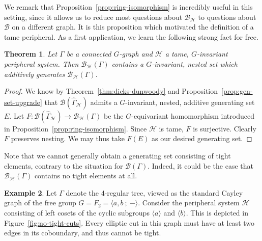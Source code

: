 \documentclass[11pt,a4paper]{amsart}
\newcommand{\pres}[2]{\langle #1 \ ; \ #2 \rangle}
\newtheorem{theorem}{Theorem}[section]%
\theoremstyle{definition}
\newtheorem{example}[theorem]{Example}
\newcommand{\per}{\mathcal{H}}
\newcommand{\br}{{\mathscr{B}}}
\begin{document}
We remark that Proposition~\ref{prop:ring-isomorphism} is incredibly useful in this setting, since it allows us to reduce most questions about $\br_\per$ to questions about $\br$ on a different graph. It is this proposition which motivated the definition of a tame peripheral. As a first application, we learn the following strong fact for free. 

\begin{theorem}\label{thm:nested-gen-set-rel}
    Let $\Gamma$ be a connected $G$-graph and $\per$ a tame, $G$-invariant peripheral system. Then $\br_\per(\Gamma)$ contains a $G$-invariant, nested set which additively generates $\br_\per(\Gamma)$.
\end{theorem}

\begin{proof}
    We know by Theorem~\ref{thm:dicks-dunwoody} and Proposition~\ref{prop:gen-set-upgrade} that $\br(\widehat \Gamma_\per)$ admits a $G$-invariant, nested, additive generating set $E$. Let $F : \br (\widehat \Gamma_{\per}) \to \br_{\per} (\Gamma)$ be the $G$-equivariant homomorphism introduced in Proposition~\ref{prop:ring-isomorphism}. Since $\per$ is tame, $F$ is surjective. Clearly $F$ preserves nesting. We may thus take $F(E)$ as our desired generating set.
\end{proof}

Note that we cannot generally obtain a generating set consisting of tight elements, contrary to the situation for $\br(\Gamma)$. Indeed, it could be the case that $\br_\per(\Gamma)$ contains no tight elements at all. 

\begin{example}
    Let $\Gamma$ denote the 4-regular tree, viewed as the standard Cayley graph of the free group $G = F_2 = \pres{a,b}{-}$. Consider the peripheral system $\per$ consisting of left cosets of the cyclic subgroups $\langle a \rangle$ and $\langle b \rangle$. This is depicted in Figure~\ref{fig:no-tight-cuts}. Every elliptic cut in this graph must have at least two edges in its coboundary, and thus cannot be tight.
\end{example}
\end{document}
